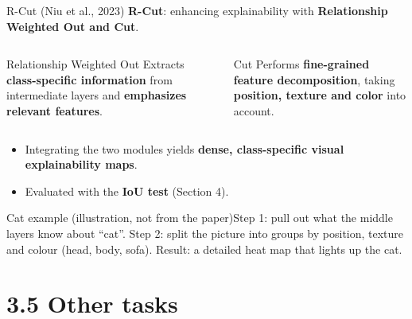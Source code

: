 \documentclass[10pt]{beamer}
\newcommand{\highlight}[1]{\textcolor{myNewColorA}{\textbf{#1}}}
\newcommand{\catex}[1]{\begin{exampleblock}{\footnotesize Cat example (illustration, not from the paper)}\footnotesize #1\end{exampleblock}}
\begin{document}
\begin{frame}{R-Cut (Niu et al., 2023)}
\textbf{R-Cut}: enhancing explainability with \highlight{Relationship Weighted Out and Cut}.
\vspace{0.4em}
\begin{columns}[T]
\begin{block}{Relationship Weighted Out}
Extracts \textbf{class-specific information} from intermediate layers and \textbf{emphasizes relevant features}.
\end{block}
\begin{block}{Cut}
Performs \textbf{fine-grained feature decomposition}, taking \textbf{position, texture and color} into account.
\end{block}
\end{columns}
\vspace{0.4em}
\begin{itemize}
  \item Integrating the two modules yields \textbf{dense, class-specific visual explainability maps}.
  \item Evaluated with the \textbf{IoU test} (Section 4).
\end{itemize}
\catex{Step 1: pull out what the middle layers know about ``cat''. Step 2: split the picture into groups by position, texture and colour (head, body, sofa). Result: a detailed heat map that lights up the cat.}
\end{frame}

\section{3.5 Other tasks}
\end{document}
